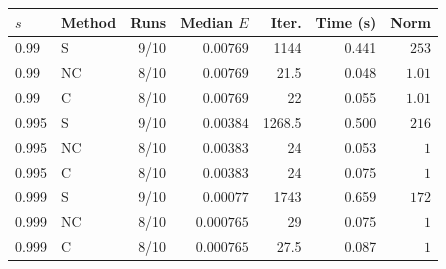 \begin{tabular}{@{}llrrrrr@{}}
\toprule
$s$ & Method & Runs & Median $E$ & Iter. & Time (s) & Norm\\
\midrule
0.99 & S & 9/10 & $0.00769$ & 1144 & 0.441 & $253$\\
0.99 & NC & 8/10 & $0.00769$ & 21.5 & 0.048 & $1.01$\\
0.99 & C & 8/10 & $0.00769$ & 22 & 0.055 & $1.01$\\
0.995 & S & 9/10 & $0.00384$ & 1268.5 & 0.500 & $216$\\
0.995 & NC & 8/10 & $0.00383$ & 24 & 0.053 & $1$\\
0.995 & C & 8/10 & $0.00383$ & 24 & 0.075 & $1$\\
0.999 & S & 9/10 & $0.00077$ & 1743 & 0.659 & $172$\\
0.999 & NC & 8/10 & $0.000765$ & 29 & 0.075 & $1$\\
0.999 & C & 8/10 & $0.000765$ & 27.5 & 0.087 & $1$\\
\bottomrule
\end{tabular}
